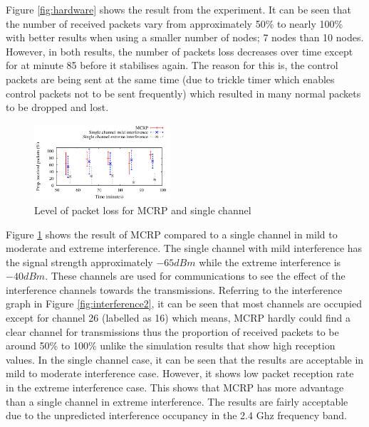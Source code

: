 Figure \ref{fig:hardware} shows the result from the experiment. It can be seen that the number of received packets vary from approximately 50\% to nearly 100\% with better results when using a smaller number of nodes; 7 nodes than 10 nodes. However, in both results, the number of packets loss decreases over time except for at minute 85 before it stabilises again. The reason for this is, the control packets are being sent at the same time (due to trickle timer which enables control packets not to be sent frequently) which resulted in many normal packets to be dropped and lost.

\begin{figure}
\centering
\includegraphics[width=0.45\textwidth]{figures/channels.pdf}
\caption{Level of packet loss for MCRP and single channel}
\label{fig:hardware2}
\end{figure}

Figure \ref{fig:hardware2} shows the result of MCRP compared to a single channel in mild to moderate and extreme interference. The single channel with mild interference has the signal strength approximately $-65 dBm$ while the extreme interference is $-40 dBm$. These channels are used for communications to see the effect of the interference channels towards the transmissions. Referring to the interference graph in Figure \ref{fig:interference2}, it can be seen that most channels are occupied except for channel 26 (labelled as 16) which means, MCRP hardly could find a clear channel for transmissions thus the proportion of received packets to be around 50\% to 100\% unlike the simulation results that show high reception values. In the single channel case, it can be seen that the results are acceptable in mild to moderate interference case. However, it shows low packet reception rate in the extreme interference case. This shows that MCRP has more advantage than a single channel in extreme interference. The results are fairly acceptable due to the unpredicted interference occupancy in the 2.4 Ghz frequency band.



